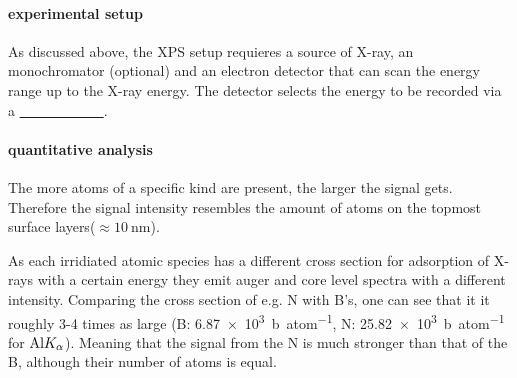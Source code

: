 \paragraph{experimental setup}
As discussed above, the XPS setup requieres a source of X-ray, an monochromator (optional) and an electron detector that can scan the energy range up to the X-ray energy. The detector selects the energy to be recorded via a \underline{\ \ \ \ \ \ \ \ \ \ \ \ }.
\paragraph{quantitative analysis}
The more atoms of a specific kind are present, the larger the signal gets. Therefore the signal intensity resembles the amount of atoms on the topmost surface layers($\approx \SI{10}{\nm}$).

As each irridiated atomic species has a different cross section for adsorption of X-rays with a certain energy they emit auger and core level spectra with a different intensity. Comparing the cross section of e.g. N with B's, one can see that it it roughly 3-4 times as large (B: \SI{6,87e3}{\barn\per atom}, N: \SI{25,82e3}{\barn\per atom} for $\textnormal{Al} K_{\alpha}$)\cite{henke_x-ray_1993}. Meaning that the signal from the N is much stronger than that of the B, although their number of atoms is equal.


